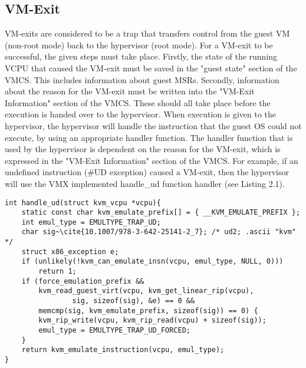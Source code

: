 \documentclass{report}
\begin{document}
\begin{spacing}{1.5}
\subsection{VM-Exit}
{\large
VM-exits are considered to be a trap that transfers control from the guest VM (non-root mode) back to the hypervisor (root mode). For a VM-exit to be successful, the given steps must take place. Firstly, the state of the running VCPU that caused the VM-exit must be saved in the "guest state" section of the VMCS. This includes information about guest MSRs. Secondly, information about the reason for the VM-exit must be written into the "VM-Exit Information" section of the VMCS. These should all take place before the execution is handed over to the hypervisor. When execution is given to the hypervisor, the hypervisor will handle the instruction that the guest OS could not execute, by using an appropriate handler function. The handler function that is used by the hypervisor is dependent on the reason for the VM-exit, which is expressed in the "VM-Exit Information" section of the VMCS. For example, if an undefined instruction (\#UD exception) caused a VM-exit, then the hypervisor will use the VMX implemented handle\_ud function handler (see Listing 2.1).
\leavevmode\newline




\begin{lstlisting}[caption={/arch/x86/kvm/x86.c:6959 | Linux kernel V5.18.8},captionpos=b]
int handle_ud(struct kvm_vcpu *vcpu){
    static const char kvm_emulate_prefix[] = { __KVM_EMULATE_PREFIX };
    int emul_type = EMULTYPE_TRAP_UD;
    char sig~\cite{10.1007/978-3-642-25141-2_7}; /* ud2; .ascii "kvm" */
    struct x86_exception e;
    if (unlikely(!kvm_can_emulate_insn(vcpu, emul_type, NULL, 0)))
        return 1;
    if (force_emulation_prefix &&
        kvm_read_guest_virt(vcpu, kvm_get_linear_rip(vcpu),
                sig, sizeof(sig), &e) == 0 &&
        memcmp(sig, kvm_emulate_prefix, sizeof(sig)) == 0) {
        kvm_rip_write(vcpu, kvm_rip_read(vcpu) + sizeof(sig));
        emul_type = EMULTYPE_TRAP_UD_FORCED;
    }
    return kvm_emulate_instruction(vcpu, emul_type);
}
\end{lstlisting}

}
\end{spacing}
\end{document}
